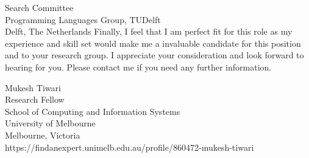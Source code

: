\documentclass{letter}
\begin{document}
\begin{letter}{Search Committee\\
Programming Languages Group, TUDelft\\
Delft, The Netherlands}
Finally, I feel that I am perfect fit for this role as my experience and skill set would make me 
a invaluable candidate for this position and to your research group. I appreciate your consideration
and look forward to hearing for you.   Please contact me if you need any further information. 


Mukesh Tiwari\\
Research Fellow \\
School of Computing and Information Systems\\
University of Melbourne\\
Melbourne, Victoria\\
https://findanexpert.unimelb.edu.au/profile/860472-mukesh-tiwari\\
\end{letter}
\end{document}
